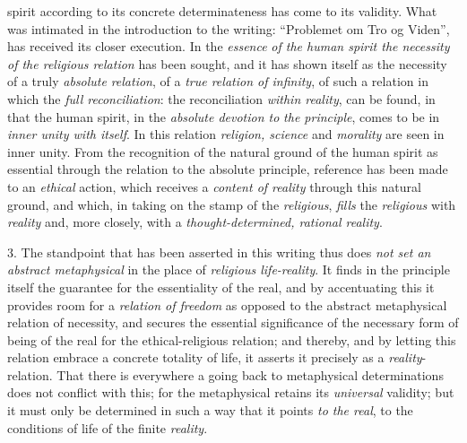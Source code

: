 \documentclass[12pt,a4paper,openany]{book}
\newcommand{\opage}[1]{\marginnote{\footnotesize\textit{[#1]}}}
\begin{document}
spirit according to its concrete determinateness has come to its validity. What was
intimated in the introduction to the writing:
``Problemet om Tro og Viden'', has received its closer execution. In the \emph{essence}
\emph{of the human spirit the necessity of the religious relation} has been sought, and it
has shown itself as the necessity of a truly \emph{absolute}
\emph{relation}, of a \emph{true relation of infinity}, of
such a relation in which the \emph{full reconciliation}: the reconciliation
\emph{within reality}, can be found, in that
the human spirit, in the \emph{absolute devotion to}
\emph{the principle}, comes to be in \emph{inner unity with itself}. In this
relation \emph{religion, science} and \emph{morality}
are seen in inner unity. From the recognition of the natural ground of the human spirit
as essential through the relation to the absolute principle, reference has been made to
an \emph{ethical} action, which receives a \emph{content of reality} through this natural ground,
and which, in taking on the stamp of the \emph{religious}, \emph{fills}
the \emph{religious} with \emph{reality} and, more closely, with
a \emph{thought-determined, rational reality}.


3. The standpoint that has been asserted in this writing thus does \emph{not set an abstract metaphysical} in the
\setcounter{footnote}{0}%
\opage{220}place of \emph{religious life-reality}. It finds in
the principle itself the guarantee for the essentiality of the real, and
by accentuating this it provides room for a \emph{relation of freedom}
as opposed to the abstract metaphysical relation of necessity, and secures the
essential significance of the necessary form of being of the real for the
ethical-religious relation;
and thereby, and by letting this relation embrace a concrete
totality of life, it asserts it precisely as a \emph{reality}-relation.
That there is everywhere a going back
to metaphysical determinations does not conflict with this; for the metaphysical
retains its \emph{universal} validity; but it must only be determined
in such a way that it points \emph{to the real}, to the conditions of life of the finite
\emph{reality}.
\end{document}
